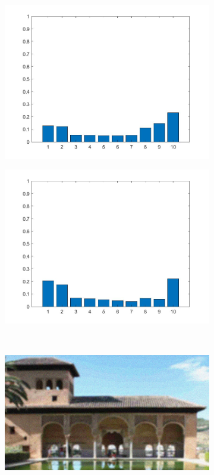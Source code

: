 \begin{figure}
\begin{subfigure}[b]{0.3\textwidth}
         \includegraphics[width=\textwidth]{./figs/simple_histogram3}
         \caption{}
         \label{}
     \end{subfigure}
     \hfill
     \begin{subfigure}[b]{0.3\textwidth}
         \centering
         \includegraphics[width=\textwidth]{./figs/wighted_histogram3}
         \caption{}
         \label{}
     \end{subfigure}
     \\
     \begin{subfigure}[b]{0.3\textwidth}
         \centering
         \includegraphics[width=\textwidth]{./figs/img243}

\end{subfigure}
\end{figure}
